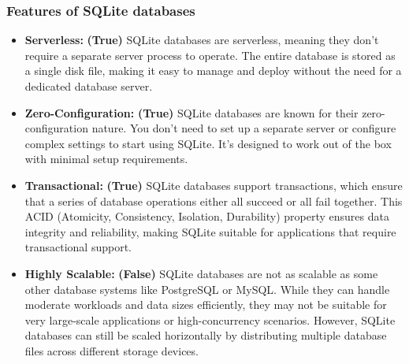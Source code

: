 \newpage
\subsubsection{Features of SQLite databases}

\begin{itemize}
\item \textbf{Serverless:} \textbf{(True)} SQLite databases are serverless, meaning they don't require a separate server process to operate. The entire database is stored as a single disk file, making it easy to manage and deploy without the need for a dedicated database server.

\item \textbf{Zero-Configuration:} \textbf{(True)} SQLite databases are known for their zero-configuration nature. You don't need to set up a separate server or configure complex settings to start using SQLite. It's designed to work out of the box with minimal setup requirements.

\item \textbf{Transactional:} \textbf{(True)} SQLite databases support transactions, which ensure that a series of database operations either all succeed or all fail together. This ACID (Atomicity, Consistency, Isolation, Durability) property ensures data integrity and reliability, making SQLite suitable for applications that require transactional support.

\item \textbf{Highly Scalable:} \textbf{(False)} SQLite databases are not as scalable as some other database systems like PostgreSQL or MySQL. While they can handle moderate workloads and data sizes efficiently, they may not be suitable for very large-scale applications or high-concurrency scenarios. However, SQLite databases can still be scaled horizontally by distributing multiple database files across different storage devices.
\end{itemize}

